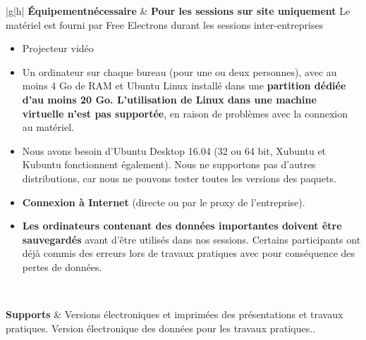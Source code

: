 \documentclass[a4paper,12pt,obeyspaces,spaces,hyphens]{article}
\begin{document}
{  \begin{tabularx}{\textwidth}{|g|h|}
    {\bf Équipement\newline nécessaire} &
    {\bf Pour les sessions sur site uniquement}
    \newline Le matériel est fourni par Free Electrons durant les
    sessions inter-entreprises
    \begin{itemize}
    \item Projecteur vidéo
    \item Un ordinateur sur chaque bureau (pour une ou deux personnes), avec au
    moins 4 Go de RAM et Ubuntu Linux installé dans une {\bf partition
    dédiée d'au moins 20 Go. L'utilisation de Linux dans une machine virtuelle
    n'est pas supportée}, en raison de problèmes avec la connexion au matériel.
    \item Nous avons besoin d'Ubuntu Desktop 16.04 (32 ou 64 bit, Xubuntu et
    Kubuntu fonctionnent également). Nous ne supportons pas d'autres
    distributions, car nous ne pouvons tester toutes les versions des
    paquets.
    \item {\bf Connexion à Internet} (directe ou par le proxy de l'entreprise).
    \item {\bf Les ordinateurs contenant des données importantes doivent être
    sauvegardés} avant d'être utilisés dans nos sessions. Certains
    participants ont déjà commis des erreurs lors de travaux pratiques
    avec pour conséquence des pertes de données.
    \end{itemize} \\
    \hline

    {\bf Supports} & Versions électroniques et imprimées des
    présentations et travaux pratiques.
    \newline Version électronique des données pour les travaux
    pratiques..\\
    \hline

\end{tabularx}}
\normalsize
\end{document}

